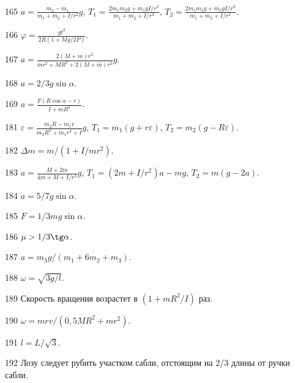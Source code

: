 \begin{Answer}{165}
$a= \frac{m_2-m_1}{m_1+m_2+I/r^2}g$, $T_1 = \frac{2m_1m_2g + m_1gI/r^2}{m_1+m_2+I/r^2}$, $T_2 = \frac{2m_1m_2g + m_2gI/r^2}{m_1+m_2+I/r^2}$.
\end{Answer}
\begin{Answer}{166}
$\varphi = \frac{gt^2}{2R(1+Mg/2P)}$.
\end{Answer}
\begin{Answer}{167}
$a = \frac{2(M+m)r^2}{mr^2+MR^2+2(M+m)r^2}g$.
\end{Answer}
\begin{Answer}{168}
$a=2/3g\sin \alpha$.
\end{Answer}
\begin{Answer}{169}
$a = \frac{F(R\cos \alpha - r)}{I + mR^2}$.
\end{Answer}
\begin{Answer}{181}
$\varepsilon = \frac{m_2R - m_1r}{m_2R^2 + m_1r^2 + I}g$, $T_1 = m_1(g+r\varepsilon)$, $T_2 = m_2(g-R\varepsilon)$.
\end{Answer}
\begin{Answer}{182}
$\Delta m = m/(1+I/mr^2)$.
\end{Answer}
\begin{Answer}{183}
$a = \frac{M+2m}{4m+M+I/r^2}g$, $T_1 = (2m+I/r^2)a - mg$, $T_2=m(g-2a)$.
\end{Answer}
\begin{Answer}{184}
$a=5/7g\sin \alpha$.
\end{Answer}
\begin{Answer}{185}
$F = 1/3 mg \sin \alpha$.
\end{Answer}
\begin{Answer}{186}
$\mu > 1/3 \tg \alpha$.
\end{Answer}
\begin{Answer}{187}
$a = m_3g/(m_1 + 6m_2 +m_3)$.
\end{Answer}
\begin{Answer}{188}
$\omega = \sqrt{3g/l}$.
\end{Answer}
\begin{Answer}{189}
Скорость вращения возрастет в $(1+mR^2/I)$ раз.
\end{Answer}
\begin{Answer}{190}
$\omega = mrv/(0,5MR^2 + mr^2)$.
\end{Answer}
\begin{Answer}{191}
$l = L/\sqrt{3}$.
\end{Answer}
\begin{Answer}{192}
Лозу следует рубить участком сабли, отстоящим на $2/3$ длины от ручки сабли.
\end{Answer}
